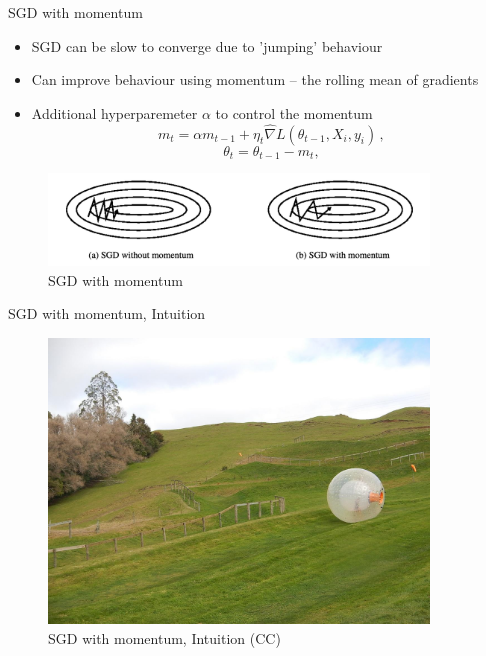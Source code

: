 \documentclass[10pt]{beamer}
\begin{document}
\begin{frame}{SGD with momentum}

\begin{itemize}
\item SGD can be slow to converge due to 'jumping' behaviour
\item Can improve behaviour using momentum -- the rolling mean of gradients
\item Additional hyperparemeter $\alpha$ to control the momentum
\[
m_t = \alpha m_{t-1} + \eta_t \hat{\nabla} L(\theta_{t-1}, X_{i}, y_{i})\,,
\]
\[
\theta_t = \theta_{t-1} - m_t,
\]

\end{itemize}

\begin{figure}[h]
\caption{SGD with momentum}
\centering
\includegraphics[width=0.9\textwidth]{figs/sgdm}
\end{figure}

\end{frame}


\begin{frame}{SGD with momentum, Intuition}

\begin{figure}[h]
\caption{SGD with momentum, Intuition (CC)}
\centering
\includegraphics[width=0.9\textwidth]{figs/zorb}
\end{figure}

\end{frame}
\end{document}
